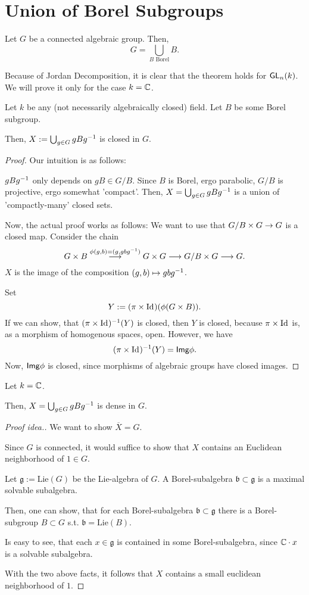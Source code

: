 \section{Union of Borel Subgroups}
\begin{theorem}
	Let $G$ be a connected algebraic group.
	Then,
	\[ G = \bigcup_{B \text{ Borel}} B.  \]
\end{theorem}
Because of Jordan Decomposition, it is clear that the theorem holds for $\textsf{GL}_n(k)$. We will prove it only for the case $k = \mathbb{C}$.

\begin{lemma}
	Let $k$ be any (not necessarily algebraically closed) field. Let $B$ be some Borel subgroup.
	
	Then, $X:= \bigcup_{g \in G} gBg^{-1}$ is closed in $G$.
\end{lemma}
\begin{proof}
	Our intuition is as follows:
	
	$gBg^{-1}$ only depends on $gB \in G/B$. Since $B$ is Borel, ergo parabolic, $G/B$ is projective, ergo somewhat 'compact'. Then, $X= \bigcup_{g \in G} gBg^{-1}$ is a union of 'compactly-many' closed sets.
	
	
	Now, the actual proof works as follows:
	We want to use that $G/B \times G \overset{}{\rightarrow} G$ is a closed map. Consider the chain
	\[ G\times B \overset{ \phi(g,b) = (g, gbg^{-1}) }{\longrightarrow} G \times G \overset{}{\longrightarrow} G / B \times G \overset{}{\longrightarrow} G. \]
	$X$ is the image of the composition $(g,b) \mapsto gbg^{-1}$.
	
	Set
	\[ Y:= (\pi \times \text{Id}_{})(\phi(G\times B)). \]
	If we can show, that $(\pi \times \text{Id}_{})^{-1}(Y)$ is closed, then $Y$ is closed, because $\pi \times \text{Id}_{}$ is, as a morphism of homogenous spaces, open. However, we have
	\[ (\pi \times \text{Id}_{})^{-1}(Y) = \textsf{Img} \phi. \]
	Now, $\textsf{Img} \phi$ is closed, since morphisms of algebraic groups have closed images.
\end{proof}

\begin{lemma}
Let $k = \mathbb{C}$.

Then, $X = \bigcup_{g\in G} gBg^{-1}$ is dense in $G$.
\end{lemma}
\begin{proof}[Proof idea.]
	We want to show $\overline{X} = G$.
	
	Since $G$ is connected, it would suffice to show that $X$ contains an Euclidean neighborhood of $1\in G$.
	
	Let $\mathfrak{g} := \mathrm{Lie}(G)$ be the Lie-algebra of $G$. A Borel-subalgebra $\mathfrak{b} \subset \mathfrak{g}$ is a maximal solvable subalgebra.
	
	Then, one can show, that for each Borel-subalgebra $\mathfrak{b} \subset \mathfrak{g}$ there is a Borel-subgroup $B \subset G$ s.t. $\mathfrak{b} = \mathrm{Lie}(B)$.
	
	Is easy to see, that each $x \in \mathfrak{g}$ is contained in some Borel-subalgebra, since $\mathbb{C} \cdot x$ is a solvable subalgebra.
	
	With the two above facts, it follows that $X$ contains a small euclidean neighborhood of $1$.
\end{proof}